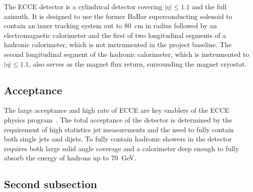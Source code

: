 The ECCE detector is a cylindrical detector covering
$\left|\eta\right| \leq 1.1$ and the full azimuth.  It is designed to use
the former BaBar superconducting solenoid to contain
an inner tracking system out to 80~cm in radius followed by an
electromagnetic calorimeter and the first of two longitudinal segments of
a hadronic calorimeter, which is not instrumented in the project baseline.  The second
longitudinal segment of the hadronic calorimeter, which is instrumented to
$|\eta| \leq 1.1$, also serves as
the magnet flux return, surrounding the magnet cryostat.

\subsection{Acceptance}

The large acceptance and high rate of ECCE are key enablers of the ECCE 
physics program~\cite{Adcox:2001jp}.
The total
acceptance of the detector is determined by the requirement of high
statistics jet measurements and the need to fully contain both single
jets and dijets.  To fully contain hadronic showers in the detector
requires both large solid angle coverage and a calorimeter deep enough
to fully absorb the energy of hadrons up to 70~GeV.


\subsection{Second subsection}
